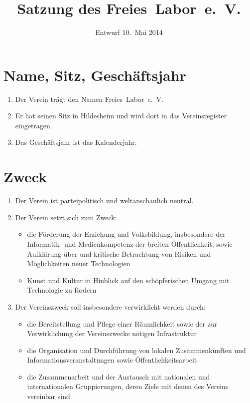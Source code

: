 \documentclass[a4paper,12pt]{scrartcl}
\title{Satzung des Freies~Labor~e.~V.}
\date{Entwurf 10.~Mai 2014}
\begin{document}
\maketitle


\section{Name, Sitz, Geschäftsjahr}
\begin{enumerate}
  \item Der Verein trägt den Namen Freies~Labor~e.~V.
  \item Er hat seinen Sitz in Hildesheim und wird dort in das Vereinsregister
    eingetragen.
  \item Das Geschäftsjahr ist das Kalenderjahr.
\end{enumerate}

\section{Zweck}
\begin{enumerate}
  \item Der Verein ist parteipolitisch und weltanschaulich neutral.
  \item Der Verein setzt sich zum Zweck:
    \begin{itemize}
      \item
         die Förderung der Erziehung und Volksbildung, insbesondere der
         Informatik- und Medienkompetenz der breiten Öffentlichkeit, sowie
         Aufklärung über und kritische Betrachtung von Risiken und
         Möglichkeiten neuer Technologien
      \item Kunst und Kultur in Hinblick auf den schöpferischen Umgang mit
        Technologie zu fördern
    \end{itemize}
  \item Der Vereinszweck soll insbesondere verwirklicht werden durch:
    \begin{itemize}
      \item die Bereitstellung und Pflege einer Räumlichkeit sowie der zur
        Verwirklichung der Vereinszwecke nötigen Infrastruktur
      \item die Organisation und Durchführung von lokalen Zusammenkünften und
        Informationsveranstaltungen sowie Öffentlichkeitsarbeit
      \item die Zusammenarbeit und der Austausch mit nationalen und
        internationalen Gruppierungen, deren Ziele mit denen des Vereins
        vereinbar sind
    \end{itemize}
\end{enumerate}
\end{document}
